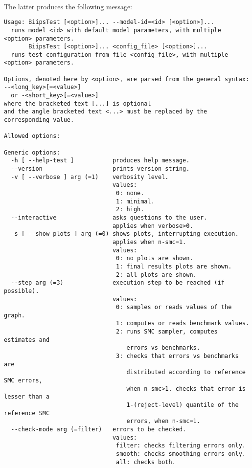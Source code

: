 \paragraph{}
The latter produces the following message:
\begin{verbatim}
Usage: BiipsTest [<option>]... --model-id=<id> [<option>]...
  runs model <id> with default model parameters, with multiple <option> parameters.
       BiipsTest [<option>]... <config_file> [<option>]...
  runs test configuration from file <config_file>, with multiple <option> parameters.

Options, denoted here by <option>, are parsed from the general syntax:     --<long_key>[=<value>]
  or -<short_key>[=<value>]
where the bracketed text [...] is optional
and the angle bracketed text <...> must be replaced by the corresponding value.

Allowed options:

Generic options:
  -h [ --help-test ]           produces help message.
  --version                    prints version string.
  -v [ --verbose ] arg (=1)    verbosity level.
                               values:
                                0: none.
                                1: minimal.
                                2: high.
  --interactive                asks questions to the user.
                               applies when verbose>0.
  -s [ --show-plots ] arg (=0) shows plots, interrupting execution.
                               applies when n-smc=1.
                               values:
                                0: no plots are shown.
                                1: final results plots are shown.
                                2: all plots are shown.
  --step arg (=3)              execution step to be reached (if possible).
                               values:
                                0: samples or reads values of the graph.
                                1: computes or reads benchmark values.
                                2: runs SMC sampler, computes estimates and 
                                   errors vs benchmarks.
                                3: checks that errors vs benchmarks are 
                                   distributed according to reference SMC errors, 
                                   when n-smc>1. checks that error is lesser than a
                                   1-(reject-level) quantile of the reference SMC 
                                   errors, when n-smc=1.
  --check-mode arg (=filter)   errors to be checked.
                               values:
                                filter: checks filtering errors only.
                                smooth: checks smoothing errors only.
                                all: checks both.


\end{verbatim}
